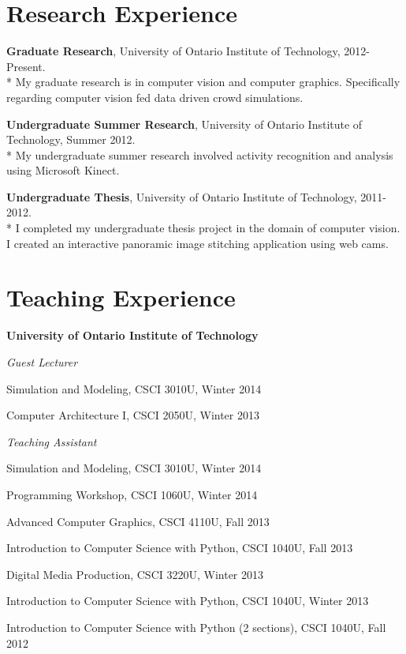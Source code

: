 \documentclass[letterpaper]{article}
\renewenvironment{itemize}{
  \begin{list}{}{
    \setlength{\leftmargin}{1.5em}
  }
}{
  \end{list}
}
\begin{document}
\section*{Research Experience}
\begin{itemize}
\item \textbf{Graduate Research}, University of Ontario Institute of Technology, 2012-Present. \\*
	My graduate research is in computer vision and computer graphics.  Specifically regarding computer vision fed data driven crowd simulations.
\item \textbf{Undergraduate Summer Research}, University of Ontario Institute of Technology,  Summer 2012.  \\*
	My undergraduate summer research involved activity recognition and analysis using Microsoft Kinect.
\item \textbf{Undergraduate Thesis}, University of Ontario Institute of Technology, 2011-2012. \\*
	I completed my undergraduate thesis project in the domain of computer vision.  I created an interactive panoramic image stitching application using web cams.
\end{itemize}


\section*{Teaching Experience}
\begin{itemize}
\item\textbf{University of Ontario Institute of Technology}
\item\textit{Guest Lecturer}
	\begin{itemize}
	\item Simulation and Modeling, CSCI 3010U, Winter 2014
 	\item Computer Architecture I, CSCI 2050U, Winter 2013
	\end{itemize}
\item\textit{Teaching Assistant}
	\begin{itemize}
	\item Simulation and Modeling, CSCI 3010U, Winter 2014
	\item Programming Workshop, CSCI 1060U, Winter 2014
	\item Advanced Computer Graphics, CSCI 4110U, Fall 2013
	\item Introduction to Computer Science with Python, CSCI 1040U, Fall 2013
	\item Digital Media Production, CSCI 3220U, Winter 2013
	\item Introduction to Computer Science with Python, CSCI 1040U, Winter 2013
	\item Introduction to Computer Science with Python (2 sections), CSCI 1040U, Fall 2012
	\end{itemize}
\end{itemize}
\end{document}
